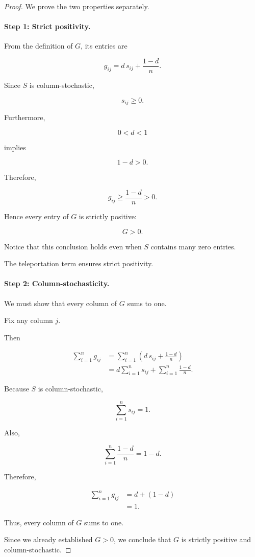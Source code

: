 \documentclass[11pt,a4paper]{article}
\theoremstyle{definition}
\theoremstyle{remark}
\begin{document}
\begin{proof}

We prove the two
properties separately.

\paragraph{Step 1: Strict positivity.}

From the definition
of $G$, its entries are

\[
g_{ij}
=
d\,s_{ij}
+
\frac{1-d}{n}.
\]

Since $S$ is
column-stochastic,

\[
s_{ij}\geq0.
\]

Furthermore,

\[
0<d<1
\]

implies

\[
1-d>0.
\]

Therefore,

\[
g_{ij}
\geq
\frac{1-d}{n}
>0.
\]

Hence every entry
of $G$ is strictly positive:

\[
\boxed{G>0.}
\]

Notice that this conclusion
holds even when $S$
contains many zero entries.

The teleportation term
ensures strict positivity.


\paragraph{Step 2: Column-stochasticity.}

We must show that every
column of $G$
sums to one.

Fix any column $j$.

Then

\[
\begin{aligned}
\sum_{i=1}^{n}g_{ij}
&=
\sum_{i=1}^{n}
\left(
d\,s_{ij}
+
\frac{1-d}{n}
\right)\\
&=
d\sum_{i=1}^{n}s_{ij}
+
\sum_{i=1}^{n}
\frac{1-d}{n}.
\end{aligned}
\]

Because $S$ is
column-stochastic,

\[
\sum_{i=1}^{n}s_{ij}=1.
\]

Also,

\[
\sum_{i=1}^{n}
\frac{1-d}{n}
=
1-d.
\]

Therefore,

\[
\begin{aligned}
\sum_{i=1}^{n}g_{ij}
&=d+(1-d)\\
&=1.
\end{aligned}
\]

Thus, every column
of $G$ sums to one.

Since we already
established $G>0$,
we conclude that $G$
is strictly positive
and column-stochastic.

\end{proof}
\end{document}
